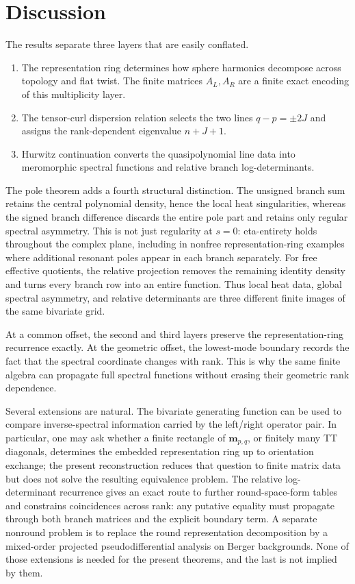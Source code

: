 \documentclass[11pt]{article}
\theoremstyle{definition}
\begin{document}
\section{Discussion}

The results separate three layers that are easily conflated.

\begin{enumerate}
\item The representation ring determines how sphere harmonics decompose
across topology and flat twist.  The finite matrices $A_L,A_R$ are a
finite exact encoding of this multiplicity layer.
\item The tensor-curl dispersion relation selects the two lines
$q-p=\pm2J$ and assigns the rank-dependent eigenvalue $n+J+1$.
\item Hurwitz continuation converts the quasipolynomial line data into
meromorphic spectral functions and relative branch log-determinants.
\end{enumerate}

The pole theorem adds a fourth structural distinction.  The unsigned
branch sum retains the central polynomial density, hence the local
heat singularities, whereas the signed branch difference discards the
entire pole part and retains only regular spectral asymmetry.  This is
not just regularity at $s=0$: eta-entirety holds throughout the complex
plane, including in nonfree representation-ring examples where
additional resonant poles appear in each branch separately.  For free
effective quotients, the relative projection removes the remaining
identity density and turns every branch row into an entire function.
Thus local heat data, global spectral asymmetry, and relative
determinants are three different finite images of the same bivariate
grid.

At a common offset, the second and third layers preserve the
representation-ring recurrence exactly.  At the geometric offset, the
lowest-mode boundary records the fact that the spectral coordinate
changes with rank.  This is why the same finite algebra can propagate
full spectral functions without erasing their geometric rank dependence.

Several extensions are natural.  The bivariate generating function can
be used to compare inverse-spectral information carried by the
left/right operator pair.  In particular, one may ask whether a finite
rectangle of $\boldsymbol m_{p,q}$, or finitely many TT diagonals,
determines the embedded representation ring up to orientation exchange;
the present reconstruction reduces that question to finite matrix data
but does not solve the resulting equivalence problem.  The relative
log-determinant recurrence gives an exact route to further
round-space-form tables and constrains coincidences across rank: any
putative equality must propagate through both branch matrices and the
explicit boundary term.  A separate
nonround problem is to replace the round representation decomposition
by a mixed-order projected pseudodifferential analysis on Berger
backgrounds.  None of those extensions is needed for the present
theorems, and the last is not implied by them.
\end{document}

